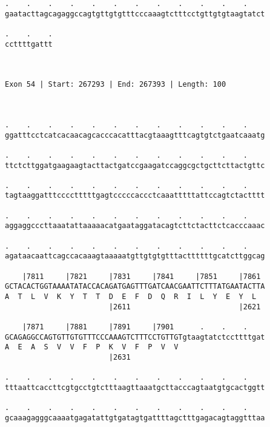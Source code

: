 \documentclass{article}
\begin{document}
\begin{Verbatim}
.    .    .    .    .    .    .    .    .    .    .    .    
gaatacttagcagaggccagtgttgtgtttcccaaagtctttcctgttgtgtaagtatct
                                                            
.    .    .
ccttttgattt
           
           
 
Exon 54 | Start: 267293 | End: 267393 | Length: 100



.    .    .    .    .    .    .    .    .    .    .    .    
ggatttcctcatcacaacagcacccacatttacgtaaagtttcagtgtctgaatcaaatg
                                                            
.    .    .    .    .    .    .    .    .    .    .    .    
ttctcttggatgaagaagtacttactgatccgaagatccaggcgctgcttcttactgttc
                                                            
.    .    .    .    .    .    .    .    .    .    .    .    
tagtaaggatttcccctttttgagtcccccaccctcaaatttttattccagtctactttt
                                                            
.    .    .    .    .    .    .    .    .    .    .    .    
aggaggcccttaaatattaaaaacatgaataggatacagtcttctacttctcacccaaac
                                                            
.    .    .    .    .    .    .    .    .    .    .    .    
agataacaattcagccacaaagtaaaaatgttgtgtgtttacttttttgcatcttggcag
                                                            
    |7811     |7821     |7831     |7841     |7851     |7861 
GCTACACTGGTAAAATATACCACAGATGAGTTTGATCAACGAATTCTTTATGAATACTTA
A  T  L  V  K  Y  T  T  D  E  F  D  Q  R  I  L  Y  E  Y  L  
                        |2611                         |2621 
  
    |7871     |7881     |7891     |7901      .    .    .    
GCAGAGGCCAGTGTTGTGTTTCCCAAAGTCTTTCCTGTTGTgtaagtatctccttttgat
A  E  A  S  V  V  F  P  K  V  F  P  V  V                    
                        |2631                               
  
.    .    .    .    .    .    .    .    .    .    .    .    
tttaattcaccttcgtgcctgtctttaagttaaatgcttacccagtaatgtgcactggtt
                                                            
.    .    .    .    .    .    .    .    .    .    .    .    
gcaaagagggcaaaatgagatattgtgatagtgattttagctttgagacagtaggtttaa
                                                            

\end{Verbatim}
\end{document}
